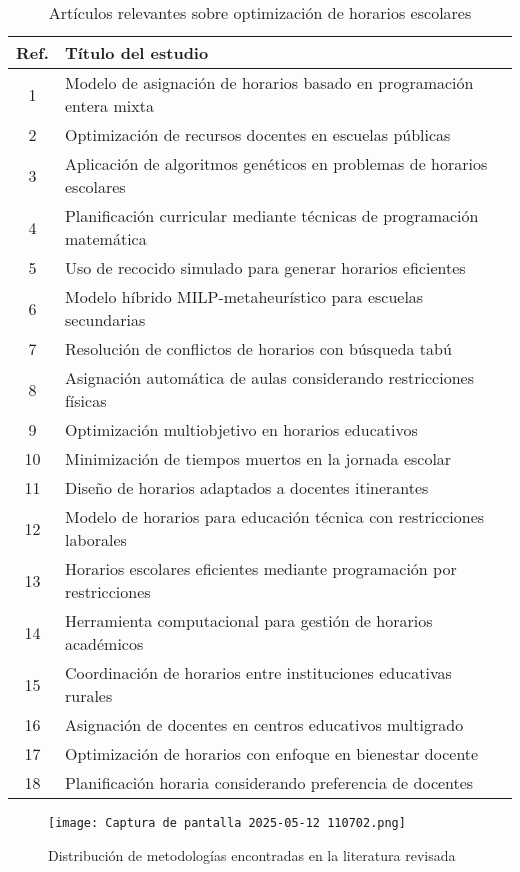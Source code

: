 \documentclass[12pt]{article}
\begin{document}
\begin{table}[!ht]
\centering
\caption{Artículos relevantes sobre optimización de horarios escolares}
\label{tab:literatura}
\begin{tabular}{cp{10cm}}
\toprule
\textbf{Ref.} & \textbf{Título del estudio} \\
\midrule
1 & Modelo de asignación de horarios basado en programación entera mixta \\
2 & Optimización de recursos docentes en escuelas públicas \\
3 & Aplicación de algoritmos genéticos en problemas de horarios escolares \\
4 & Planificación curricular mediante técnicas de programación matemática \\
5 & Uso de recocido simulado para generar horarios eficientes \\
6 & Modelo híbrido MILP-metaheurístico para escuelas secundarias \\
7 & Resolución de conflictos de horarios con búsqueda tabú \\
8 & Asignación automática de aulas considerando restricciones físicas \\
9 & Optimización multiobjetivo en horarios educativos \\
10 & Minimización de tiempos muertos en la jornada escolar \\
11 & Diseño de horarios adaptados a docentes itinerantes \\
12 & Modelo de horarios para educación técnica con restricciones laborales \\
13 & Horarios escolares eficientes mediante programación por restricciones \\
14 & Herramienta computacional para gestión de horarios académicos \\
15 & Coordinación de horarios entre instituciones educativas rurales \\
16 & Asignación de docentes en centros educativos multigrado \\
17 & Optimización de horarios con enfoque en bienestar docente \\
18 & Planificación horaria considerando preferencia de docentes \\
\bottomrule
\end{tabular}
\end{table}

\begin{figure}[!ht]
\centering
\texttt{[image: Captura de pantalla 2025-05-12 110702.png]}
\caption{Distribución de metodologías encontradas en la literatura revisada}
\label{fig:metodologias}
\end{figure}
\end{document}
